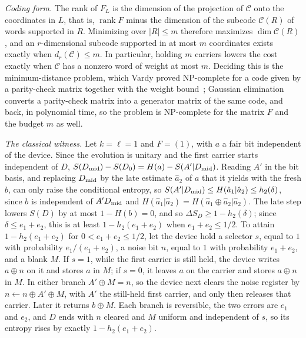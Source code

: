 \emph{Coding form.} The rank of $F_L$ is the dimension of the projection of $\mathcal C$ onto the coordinates in $L$, that is, $\operatorname{rank}F$ minus the dimension of the subcode $\mathcal C(R)$ of words supported in $R$. Minimizing over $|R|\le m$ therefore maximizes $\dim\mathcal C(R)$, and an $r$-dimensional subcode supported in at most $m$ coordinates exists exactly when $d_r(\mathcal C)\le m$. In particular, holding $m$ carriers lowers the cost exactly when $\mathcal C$ has a nonzero word of weight at most $m$. Deciding this is the minimum-distance problem, which Vardy proved NP-complete for a code given by a parity-check matrix together with the weight bound~\cite{Vardy97}; Gaussian elimination converts a parity-check matrix into a generator matrix of the same code, and back, in polynomial time, so the problem is NP-complete for the matrix $F$ and the budget $m$ as well.

\emph{The classical witness.} Let $k=\ell=1$ and $F=(1)$, with $a$ a fair bit independent of the device. Since the evolution is unitary and the first carrier starts independent of $D$, $S(D_{\rm mid})-S(D_0)=H(a)-S(A'|D_{\rm mid})$. Reading $A'$ in the bit basis, and replacing $D_{\rm mid}$ by the late estimate $\hat a_2$ of $a$ that it yields with the fresh $b$, can only raise the conditional entropy, so $S(A'|D_{\rm mid})\le H(\hat a_1|\hat a_2)\le h_2(\delta)$, since $b$ is independent of $A'D_{\rm mid}$ and $H(\hat a_1|\hat a_2)=H(\hat a_1\oplus\hat a_2|\hat a_2)$. The late step lowers $S(D)$ by at most $1-H(b)=0$, and so $\Delta S_D\ge1-h_2(\delta)$; since $\delta\le e_1+e_2$, this is at least $1-h_2(e_1+e_2)$ when $e_1+e_2\le1/2$. To attain $1-h_2(e_1+e_2)$ for $0<e_1+e_2\le1/2$, let the device hold a selector $s$, equal to $1$ with probability $e_1/(e_1+e_2)$, a noise bit $n$, equal to $1$ with probability $e_1+e_2$, and a blank $M$. If $s=1$, while the first carrier is still held, the device writes $a\oplus n$ on it and stores $a$ in $M$; if $s=0$, it leaves $a$ on the carrier and stores $a\oplus n$ in $M$. In either branch $A'\oplus M=n$, so the device next clears the noise register by $n\leftarrow n\oplus A'\oplus M$, with $A'$ the still-held first carrier, and only then releases that carrier. Later it returns $b\oplus M$. Each branch is reversible, the two errors are $e_1$ and $e_2$, and $D$ ends with $n$ cleared and $M$ uniform and independent of $s$, so its entropy rises by exactly $1-h_2(e_1+e_2)$.

